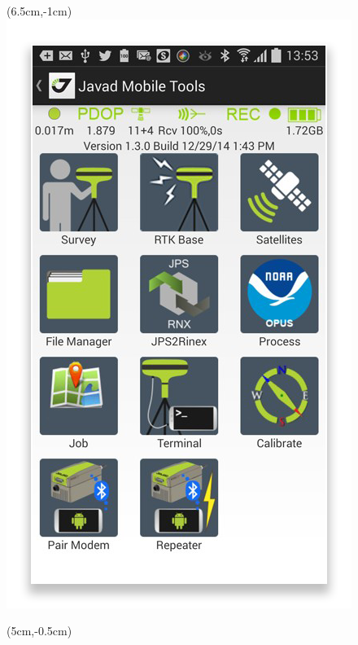 \documentclass[xetex,с,aspectratio=169]{beamer}
\begin{document}
\begin{frame}
\begin{textblock*}{3cm}
  \end{textblock*}
  \begin{textblock*}{1.5cm}(6.5cm,-1cm)
    \includegraphics[width=\textwidth]{../img/javad-mobile-tools}
  \end{textblock*}
  \begin{textblock*}{3cm}(5cm,-0.5cm)

\end{textblock*}
\end{frame}
\end{document}
